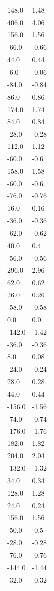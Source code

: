 \begin{longtable}{ll}
148.0 & 1.48 \\
406.0 & 4.06 \\
156.0 & 1.56 \\
-66.0 & -0.66 \\
44.0 & 0.44 \\
-6.0 & -0.06 \\
-84.0 & -0.84 \\
86.0 & 0.86 \\
174.0 & 1.74 \\
84.0 & 0.84 \\
-28.0 & -0.28 \\
112.0 & 1.12 \\
-60.0 & -0.6 \\
158.0 & 1.58 \\
-60.0 & -0.6 \\
-76.0 & -0.76 \\
16.0 & 0.16 \\
-36.0 & -0.36 \\
-62.0 & -0.62 \\
40.0 & 0.4 \\
-56.0 & -0.56 \\
296.0 & 2.96 \\
62.0 & 0.62 \\
26.0 & 0.26 \\
-58.0 & -0.58 \\
0.0 & 0.0 \\
-142.0 & -1.42 \\
-36.0 & -0.36 \\
8.0 & 0.08 \\
-24.0 & -0.24 \\
28.0 & 0.28 \\
44.0 & 0.44 \\
-156.0 & -1.56 \\
-74.0 & -0.74 \\
-176.0 & -1.76 \\
182.0 & 1.82 \\
204.0 & 2.04 \\
-132.0 & -1.32 \\
34.0 & 0.34 \\
128.0 & 1.28 \\
24.0 & 0.24 \\
156.0 & 1.56 \\
-50.0 & -0.5 \\
-28.0 & -0.28 \\
-76.0 & -0.76 \\
-144.0 & -1.44 \\
-32.0 & -0.32 \\

\end{longtable}
